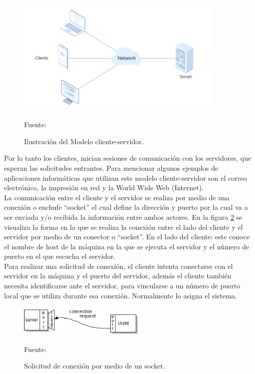 \begin{figure}[H]
    \begin{center}
        \includegraphics[width=10cm]{img/capitulo_2/client-server.jpeg}        
    \end{center}
    \begin{center}
        \caption{Ilustración del Modelo cliente-servidor.}
        Fuente: \cite{clientserver}
        \label{fig:client_server}
    \end{center}
\end{figure}

Por lo tanto los clientes, inician sesiones de comunicación con los servidores, que esperan las solicitudes entrantes. Para mencionar algunos ejemplos de aplicaciones informáticas que utilizan este modelo cliente-servidor son el correo electrónico, la impresión en red y la World Wide Web (Internet).\\

La comunicación entre el cliente y el servidor se realiza por medio de una conexión o enchufe ``socket'' el cual define la dirección y puerto por la cual va a ser enviada y/o recibida la información entre ambos actores. En la figura \ref{fig:socket_request} se visualiza la forma en la que se realiza la conexión entre el lado del cliente y el servidor por medio de un conector o ``socket''. En el lado del cliente: este conoce el nombre de host de la máquina en la que se ejecuta el servidor y el número de puerto en el que escucha el servidor.\\

Para realizar una solicitud de conexión, el cliente intenta conectarse con el servidor en la máquina y el puerto del servidor, además el cliente también necesita identificarse ante el servidor, para vincularse a un número de puerto local que se utiliza durante esa conexión. Normalmente lo asigna el sistema.\\

\begin{figure}[H]
    \begin{center}
        \includegraphics[width=6cm]{img/capitulo_2/socket_request.jpg}
    \end{center}
    \begin{center}
        \caption{Solicitud de conexión por medio de un socket.}
        Fuente: \cite{socketconnection}
        \label{fig:socket_request}
    \end{center}
\end{figure}

